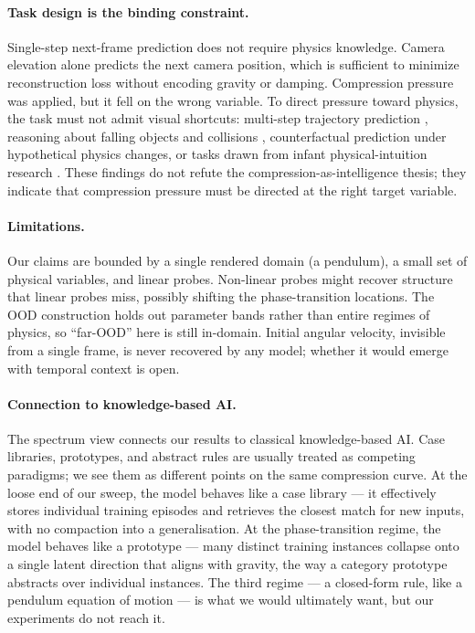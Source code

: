 \documentclass[letterpaper]{article} %
\begin{document}
\paragraph{Task design is the binding constraint.}
Single-step next-frame prediction does not require physics knowledge. Camera elevation alone predicts the next camera position, which is sufficient to minimize reconstruction loss without encoding gravity or damping. Compression pressure was applied, but it fell on the wrong variable. To direct pressure toward physics, the task must not admit visual shortcuts: multi-step trajectory prediction \citep{hafner2023dreamer}, reasoning about falling objects and collisions \citep{riochet2018intphys}, counterfactual prediction under hypothetical physics changes, or tasks drawn from infant physical-intuition research \citep{spelke2007core}. These findings do not refute the compression-as-intelligence thesis; they indicate that compression pressure must be directed at the right target variable.

\paragraph{Limitations.}
Our claims are bounded by a single rendered domain (a pendulum), a small set of physical variables, and linear probes. Non-linear probes might recover structure that linear probes miss, possibly shifting the phase-transition locations. The OOD construction holds out parameter bands rather than entire regimes of physics, so ``far-OOD'' here is still in-domain. Initial angular velocity, invisible from a single frame, is never recovered by any model; whether it would emerge with temporal context is open.

\paragraph{Connection to knowledge-based AI.}
The spectrum view connects our results to classical knowledge-based AI. Case libraries, prototypes, and abstract rules are usually treated as competing paradigms; we see them as different points on the same compression curve. At the loose end of our sweep, the model behaves like a case library --- it effectively stores individual training episodes and retrieves the closest match for new inputs, with no compaction into a generalisation. At the phase-transition regime, the model behaves like a prototype --- many distinct training instances collapse onto a single latent direction that aligns with gravity, the way a category prototype abstracts over individual instances. The third regime --- a closed-form rule, like a pendulum equation of motion --- is what we would ultimately want, but our experiments do not reach it.
\end{document}
